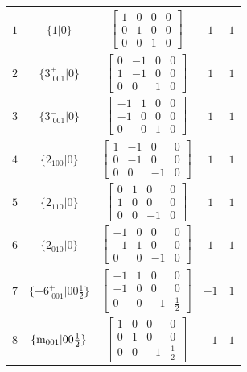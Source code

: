 \documentclass[fleqn,8pt]{jsarticle}
\begin{document}
\begin{longtable}{ccccc}
$ 1 $ & $ \{1|0\} $ & $ \begin{bmatrix} 1 & 0 & 0 & 0 \\ 0 & 1 & 0 & 0 \\ 0 & 0 & 1 & 0 \end{bmatrix} $ & $ 1 $ & $ 1 $ \\ \hline
$ 2 $ & $ \{3^{+}_{\,\,001}|0\} $ & $ \begin{bmatrix} 0 & -1 & 0 & 0 \\ 1 & -1 & 0 & 0 \\ 0 & 0 & 1 & 0 \end{bmatrix} $ & $ 1 $ & $ 1 $ \\ \hline
$ 3 $ & $ \{3^{-}_{\,\,001}|0\} $ & $ \begin{bmatrix} -1 & 1 & 0 & 0 \\ -1 & 0 & 0 & 0 \\ 0 & 0 & 1 & 0 \end{bmatrix} $ & $ 1 $ & $ 1 $ \\ \hline
$ 4 $ & $ \{2{}_{100}|0\} $ & $ \begin{bmatrix} 1 & -1 & 0 & 0 \\ 0 & -1 & 0 & 0 \\ 0 & 0 & -1 & 0 \end{bmatrix} $ & $ 1 $ & $ 1 $ \\ \hline
$ 5 $ & $ \{2{}_{110}|0\} $ & $ \begin{bmatrix} 0 & 1 & 0 & 0 \\ 1 & 0 & 0 & 0 \\ 0 & 0 & -1 & 0 \end{bmatrix} $ & $ 1 $ & $ 1 $ \\ \hline
$ 6 $ & $ \{2{}_{010}|0\} $ & $ \begin{bmatrix} -1 & 0 & 0 & 0 \\ -1 & 1 & 0 & 0 \\ 0 & 0 & -1 & 0 \end{bmatrix} $ & $ 1 $ & $ 1 $ \\ \hline
$ 7 $ & $ \{-6^{+}_{\,\,001}|0 0 \frac{1}{2}\} $ & $ \begin{bmatrix} -1 & 1 & 0 & 0 \\ -1 & 0 & 0 & 0 \\ 0 & 0 & -1 & \frac{1}{2} \end{bmatrix} $ & $ -1 $ & $ 1 $ \\ \hline
$ 8 $ & $ \{{\rm m}_{001}|0 0 \frac{1}{2}\} $ & $ \begin{bmatrix} 1 & 0 & 0 & 0 \\ 0 & 1 & 0 & 0 \\ 0 & 0 & -1 & \frac{1}{2} \end{bmatrix} $ & $ -1 $ & $ 1 $ \\ \hline

\end{longtable}
\end{document}

